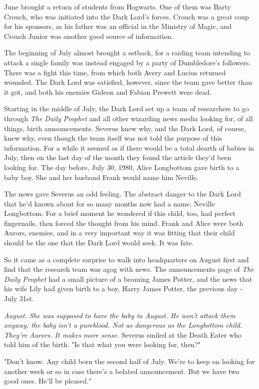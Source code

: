 June brought a return of students from Hogwarts. One of them was Barty Crouch, who was initiated into the Dark Lord's forces. Crouch was a great coup for his sponsors, as his father was an official in the Ministry of Magic, and Crouch Junior was another good source of information.

The beginning of July almost brought a setback, for a raiding team intending to attack a single family was instead engaged by a party of Dumbledore's followers. There was a fight this time, from which both Avery and Lucius returned wounded. The Dark Lord was satisfied, however, since the team gave better than it got, and both his enemies Gideon and Fabian Prewett were dead.

Starting in the middle of July, the Dark Lord set up a team of researchers to go through \emph{The Daily Prophet} and all other wizarding news media looking for, of all things, birth announcements. Severus knew why, and the Dark Lord, of course, knew why, even though the team itself was not told the purpose of this information. For a while it seemed as if there would be a total dearth of babies in July, then on the last day of the month they found the article they'd been looking for. The day before, July 30, 1980, Alice Longbottom gave birth to a baby boy. She and her husband Frank would name him Neville.

The news gave Severus an odd feeling. The abstract danger to the Dark Lord that he'd known about for so many months now had a name: Neville Longbottom. For a brief moment he wondered if this child, too, had perfect fingernails, then forced the thought from his mind. Frank and Alice were both Aurors, enemies, and in a very important way it was fitting that their child should be the one that the Dark Lord would seek. It was fate.

So it came as a complete surprise to walk into headquarters on August first and find that the research team was agog with news. The announcements page of \emph{The Daily Prophet} had a small picture of a beaming James Potter, and the news that his wife Lily had given birth to a boy, Harry James Potter, the previous day - July 31st.

\emph{August. She was supposed to have the baby in August. He won't attack them anyway; the baby isn't a pureblood. Not as dangerous as the Longbottom child. They're Aurors. It makes more sense.} Severus smiled at the Death Eater who told him of the birth. "Is that what you were looking for, then?"

"Don't know. Any child born the second half of July. We're to keep on looking for another week or so in case there's a belated announcement. But we have two good ones. He'll be pleased."

